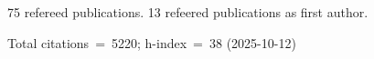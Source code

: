 75 refereed publications. 13 refeered publications as first author.

Total citations~=~5220; h-index~=~38 (2025-10-12)